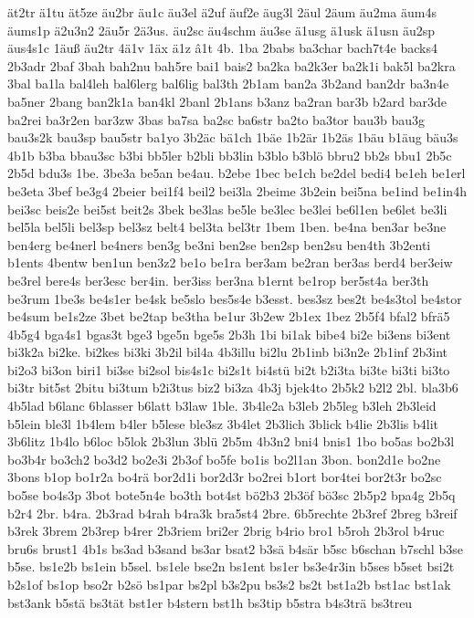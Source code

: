 {ät2tr
ä1tu
ät5ze
äu2br
äu1c
äu3el
ä2uf
äuf2e
äug3l
2äul
2äum
äu2ma
äum4s
äums1p
ä2u3n2
2äu5r
2ä3us.
äu2sc
äu4schm
äu3se
ä1usg
ä1usk
ä1usn
äu2sp
äus4s1c
1äuß
äu2tr
4ä1v
1äx
ä1z
â1t
4b.
1ba
2babs
ba3char
bach7t4e
backs4
2b3adr
2baf
3bah
bah2nu
bah5re
bai1
bais2
ba2ka
ba2k3er
ba2k1i
bak5l
ba2kra
3bal
ba1la
bal4leh
bal6lerg
bal6lig
bal3th
2b1am
ban2a
3b2and
ban2dr
ba3n4e
ba5ner
2bang
ban2k1a
ban4kl
2banl
2b1ans
b3anz
ba2ran
bar3b
b2ard
bar3de
ba2rei
ba3r2en
bar3zw
3bas
ba7sa
ba2sc
ba6str
ba2to
ba3tor
bau3b
bau3g
bau3s2k
bau3sp
bau5str
ba1yo
3b2äc
bä1ch
1bäe
1b2är
1b2äs
1bäu
b1äug
bäu3s
4b1b
b3ba
bbau3sc
b3bi
bb5ler
b2bli
bb3lin
b3blo
b3blö
bbru2
bb2s
bbu1
2b5c
2b5d
bdu3s
1be.
3be3a
be5an
be4au.
b2ebe
1bec
be1ch
be2del
bedi4
be1eh
be1erl
be3eta
3bef
be3g4
2beier
bei1f4
beil2
bei3la
2beime
3b2ein
bei5na
be1ind
be1in4h
bei3sc
beis2e
bei5st
beit2s
3bek
be3las
be5le
be3lec
be3lei
be6l1en
be6let
be3li
bel5la
bel5li
bel3sp
bel3sz
belt4
bel3ta
bel3tr
1bem
1ben.
be4na
ben3ar
be3ne
ben4erg
be4nerl
be4ners
ben3g
be3ni
ben2se
ben2sp
ben2su
ben4th
3b2enti
b1ents
4bentw
ben1un
ben3z2
be1o
be1ra
ber3am
be2ran
ber3as
berd4
ber3eiw
be3rel
bere4s
ber3esc
ber4in.
ber3iss
ber3na
b1ernt
be1rop
ber5st4a
ber3th
be3rum
1be3s
be4s1er
be4sk
be5slo
bes5s4e
b3esst.
bes3sz
bes2t
be4s3tol
be4stor
be4sum
be1s2ze
3bet
be2tap
be3tha
be1ur
3b2ew
2b1ex
1bez
2b5f4
bfal2
bfrä5
4b5g4
bga4s1
bgas3t
bge3
bge5n
bge5s
2b3h
1bi
bi1ak
bibe4
bi2e
bi3ens
bi3ent
bi3k2a
bi2ke.
bi2kes
bi3ki
3b2il
bil4a
4b3illu
bi2lu
2b1inb
bi3n2e
2b1inf
2b3int
bi2o3
bi3on
biri1
bi3se
bi2sol
bis4s1c
bi2s1t
bi4stü
bi2t
b2i3ta
bi3te
bi3ti
bi3to
bi3tr
bit5st
2bitu
bi3tum
b2i3tus
biz2
bi3za
4b3j
bjek4to
2b5k2
b2l2
2bl.
bla3b6
4b5lad
b6lanc
6blasser
b6latt
b3law
1ble.
3b4le2a
b3leb
2b5leg
b3leh
2b3leid
b5lein
ble3l
1b4lem
b4ler
b5lese
ble3sz
3b4let
2b3lich
3blick
b4lie
2b3lis
b4lit
3b6litz
1b4lo
b6loc
b5lok
2b3lun
3blü
2b5m
4b3n2
bni4
bnis1
1bo
bo5as
bo2b3l
bo3b4r
bo3ch2
bo3d2
bo2e3i
2b3of
bo5fe
bo1is
bo2l1an
3bon.
bon2d1e
bo2ne
3bons
b1op
bo1r2a
bo4rä
bor2d1i
bor2d3r
bo2rei
b1ort
bor4tei
bor2t3r
bo2sc
bo5se
bo4s3p
3bot
bote5n4e
bo3th
bot4st
bö2b3
2b3öf
bö3sc
2b5p2
bpa4g
2b5q
b2r4
2br.
b4ra.
2b3rad
b4rah
b4ra3k
bra5st4
2bre.
6b5rechte
2b3ref
2breg
b3reif
b3rek
3brem
2b3rep
b4rer
2b3riem
bri2er
2brig
b4rio
bro1
b5roh
2b3rol
b4ruc
bru6s
brust1
4b1s
bs3ad
b3sand
bs3ar
bsat2
b3sä
b4sär
b5sc
b6schan
b7schl
b3se
b5se.
bs1e2b
bs1ein
b5sel.
bs1ele
bse2n
bs1ent
bs1er
bs3e4r3in
b5ses
b5set
bsi2t
b2s1of
bs1op
bso2r
b2sö
bs1par
bs2pl
b3s2pu
bs3s2
bs2t
bst1a2b
bst1ac
bst1ak
bst3ank
b5stä
bs3tät
bst1er
b4stern
bst1h
bs3tip
b5stra
b4s3trä
bs3treu
}
